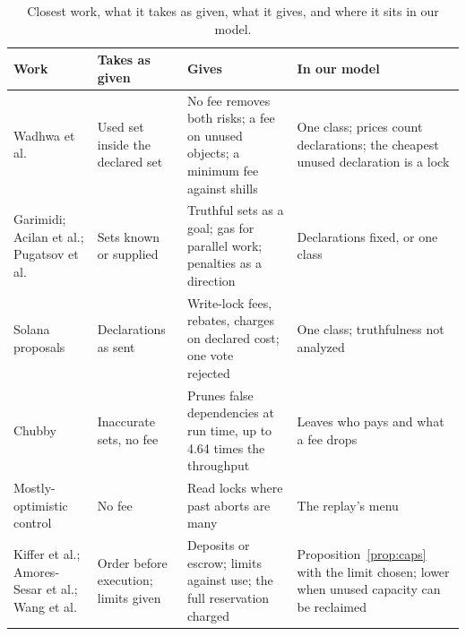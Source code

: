 \begin{table}[t]
\centering
\caption{Closest work, what it takes as given, what it gives, and where it sits in our model.}
\label{tab:related}
\footnotesize
\setlength{\tabcolsep}{3pt}
\begin{tabular}{@{}>{\raggedright\arraybackslash}p{}>{\raggedright\arraybackslash}p{}>{\raggedright\arraybackslash}p{}>{\raggedright\arraybackslash}p{}@{}}
\toprule
Work & Takes as given & Gives & In our model \\
\midrule
Wadhwa et al.~\cite{wadhwa2026perils} & Used set inside the declared set & No fee removes both risks; a fee on unused objects; a minimum fee against shills & One class; prices count declarations; the cheapest unused declaration is a lock \\
Garimidi; Acilan et al.; Pugatsov et al.~\cite{garimidi2023solana,acilan2025transaction,pugatsov2026execution} & Sets known or supplied & Truthful sets as a goal; gas for parallel work; penalties as a direction & Declarations fixed, or one class \\
Solana proposals~\cite{simd0110,simd0061,eclipse2024solana,simd0553} & Declarations as sent & Write-lock fees, rebates, charges on declared cost; one vote rejected~\cite{sgp0003} & One class; truthfulness not analyzed \\
Chubby~\cite{wei2026chubby} & Inaccurate sets, no fee & Prunes false dependencies at run time, up to 4.64 times the throughput & Leaves who pays and what a fee drops \\
Mostly-optimistic control~\cite{wang2016mostly} & No fee & Read locks where past aborts are many & The replay's menu \\
Kiffer et al.; Amores-Sesar et al.; Wang et al.~\cite{kiffer2024nakamoto,amoressesar2026tragedy,wang2026blockspace} & Order before execution; limits given & Deposits or escrow; limits against use; the full reservation charged & Proposition~\ref{prop:caps} with the limit chosen; lower when unused capacity can be reclaimed \\
\bottomrule
\end{tabular}
\end{table}
